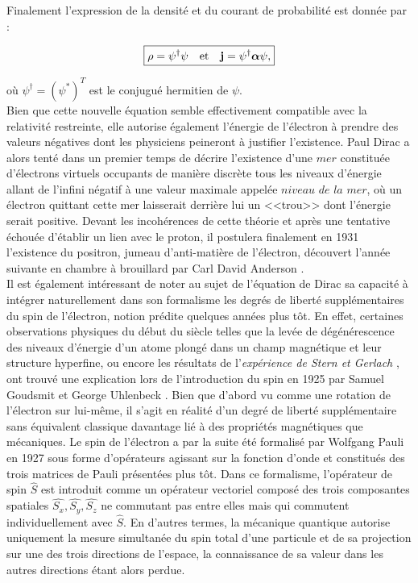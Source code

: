         Finalement l'expression de la densité et du courant de probabilité est donnée par :

        \begin{equation}
            \boxed{
            \rho=\psi^{\dag}\psi \quad \mbox{et} \quad \vb{j}=\psi^{\dag}\vb*{\alpha}\psi,
            }
        \label{probdirac}
        \end{equation}

        où $\psi^{\dag}=(\psi^*)^T$ est le conjugué hermitien de $\psi$. \\
        
        Bien que cette nouvelle équation semble effectivement compatible avec la relativité restreinte, elle autorise également l'énergie de l'électron à prendre des valeurs négatives dont les physiciens peineront à justifier l'existence. Paul Dirac a alors tenté dans un premier temps de décrire l'existence d'une $\textit{mer}$ constituée d'électrons virtuels occupants de manière discrète tous les niveaux d'énergie allant de l'infini négatif à une valeur maximale appelée $\textit{niveau de la mer}$, où un électron quittant cette mer laisserait derrière lui un <<trou>> dont l'énergie serait positive. Devant les incohérences de cette théorie et après une tentative échouée d'établir un lien avec le proton, il postulera finalement en 1931 l'existence du positron, jumeau d'anti-matière de l'électron, découvert l'année suivante en chambre à brouillard par Carl David Anderson \cite{Anderson1932}. \\
        
        Il est également intéressant de noter au sujet de l'équation de Dirac sa capacité à intégrer naturellement dans son formalisme les degrés de liberté supplémentaires du spin de l'électron, notion prédite quelques années plus tôt. En effet, certaines observations physiques du début du siècle telles que la levée de dégénérescence des niveaux d'énergie d'un atome plongé dans un champ magnétique et leur structure hyperfine, ou encore les résultats de l'\textit{expérience de Stern et Gerlach} \cite{Gerlach1922}, ont trouvé une explication lors de l'introduction du spin en 1925 par Samuel Goudsmit et George Uhlenbeck \cite{Uhlenbeck1925}. Bien que d'abord vu comme une rotation de l'électron sur lui-même, il s'agit en réalité d'un degré de liberté supplémentaire sans équivalent classique davantage lié à des propriétés magnétiques que mécaniques. Le spin de l'électron a par la suite été formalisé par Wolfgang Pauli en 1927 sous forme d'opérateurs agissant sur la fonction d'onde et constitués des trois matrices de Pauli présentées plus tôt. Dans ce formalisme, l'opérateur de spin $\hat{S}$ est introduit comme un opérateur vectoriel composé des trois composantes spatiales $\hat{S_x}, \hat{S_y}, \hat{S_z}$ ne commutant pas entre elles mais qui commutent individuellement avec $\hat{S}$. En d'autres termes, la mécanique quantique autorise uniquement la mesure simultanée du spin total d'une particule et de sa projection sur une des trois directions de l'espace, la connaissance de sa valeur dans les autres directions étant alors perdue.
        
